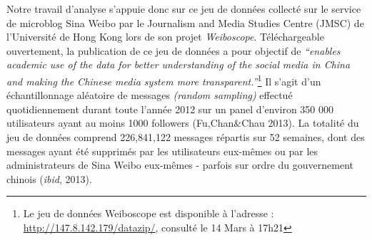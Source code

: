 Notre travail d{\textquoteright}analyse s{\textquoteright}appuie donc
sur ce jeu de donn\'ees collect\'e sur le service de microblog Sina
Weibo par le Journalism and Media Studies Centre (JMSC) de
l{\textquoteright}Universit\'e de Hong Kong lors de son projet
\textit{Weiboscope}. T\'el\'echargeable ouvertement, la publication de
ce jeu de donn\'ees a pour objectif de
\textit{{\textquotedblleft}enables academic use of the data for better
understanding of the social }\textit{media in China and making the
Chinese media system more transparent.{\textquotedblright}}\footnote{
Le jeu de donn\'ees Weiboscope est disponible \`a l{\textquoteright}adresse :
\url{http://147.8.142.179/datazip/}, consult\'e le 14 Mars \`a 17h21 }\textit{ }Il s{\textquoteright}agit
d{\textquoteright}un \'echantillonnage al\'eatoire de messages
\textit{(random sampling)} effectu\'e quotidiennement durant toute
l{\textquoteright}ann\'ee 2012 sur un panel d{\textquoteright}environ
350 000 utilisateurs ayant au moins 1000 followers (Fu,Chan\&Chau
2013). La totalit\'e du jeu de donn\'ees comprend 226,841,122 messages
r\'epartis sur 52 semaines, dont des messages ayant \'et\'e supprim\'es
par les utilisateurs eux-m\^emes ou par les administrateurs de Sina
Weibo eux-m\^emes - parfois sur ordre du gouvernement chinois
(\textit{ibid}, 2013).

